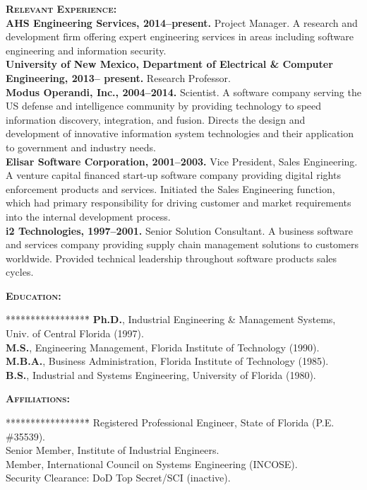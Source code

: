 \documentclass{sbir}
\begin{document}
{\vspace{-6pt}
\textbf{\textsc{Relevant Experience:}}~\\
{\bfseries AHS Engineering Services, 2014--present.} Project Manager. A research and development firm offering expert engineering services in areas including software engineering and information security.~\\
{\bfseries University of New Mexico, Department of Electrical \& Computer Engineering, 2013-- present.} Research Professor.~\\
{\bfseries Modus Operandi, Inc., 2004--2014.} Scientist. A software company serving the US defense and intelligence community by providing technology to speed information discovery, integration, and fusion. Directs the design and development of innovative information system technologies and their application to government and industry needs.~\\
{\bfseries Elisar Software Corporation, 2001--2003.} Vice President, Sales Engineering. A venture capital financed start-up software company providing digital rights enforcement products and services. Initiated the Sales Engineering function, which had primary responsibility for driving customer and market requirements into the internal development process.~\\
{\bfseries i2 Technologies, 1997--2001.} Senior Solution Consultant. A business software and services company providing supply chain management solutions to customers worldwide. Provided technical leadership throughout software products sales cycles.

\vspace{-12pt}
\textbf{\textsc{Education:}}
\vspace{-29pt}
\begin{tabbing}*****************\=\kill
 \> {\bfseries Ph.D.}, Industrial Engineering \& Management Systems, Univ. of Central Florida (1997). \\
 \> {\bfseries M.S.}, Engineering Management, Florida Institute of Technology (1990). \\
 \> {\bfseries M.B.A.}, Business Administration, Florida Institute of Technology (1985). \\
 \> {\bfseries B.S.}, Industrial and Systems Engineering, University of Florida (1980).
\end{tabbing}

\vspace{-12pt}
\textbf{\textsc{Affiliations:}}
\vspace{-30pt}
\begin{tabbing}*****************\=\kill
\> Registered Professional Engineer, State of Florida (P.E. \#35539). \\
\> Senior Member, Institute of Industrial Engineers. \\
\> Member, International Council on Systems Engineering (INCOSE). \\
\> Security Clearance: DoD Top Secret/SCI (inactive).
\end{tabbing}


}
\end{document}
